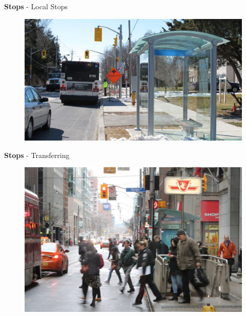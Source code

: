 \documentclass[aspectratio=169]{beamer}
\begin{document}
\begin{frame}
	
	\textbf{Stops} - Local Stops
	
	\begin{figure}
		\centering
		\includegraphics[width=0.8\linewidth]{images/bus_stop_ttc.jpeg}
	\end{figure}
	
\end{frame}




\begin{frame}
	
	\textbf{Stops} - Transferring
	
	\begin{figure}
		\centering
		\includegraphics[width=0.8\linewidth]{images/ttc_transfer.jpg}
	\end{figure}
	
\end{frame}
\end{document}
